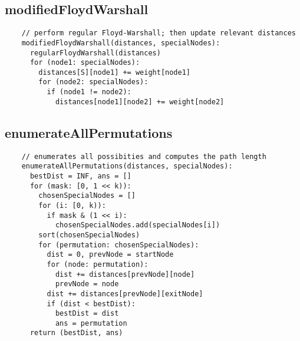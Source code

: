 \documentclass[12pt]{report}
\begin{document}
\subsection{modifiedFloydWarshall}
\begin{tcolorbox}
\begin{verbatim}
    // perform regular Floyd-Warshall; then update relevant distances
    modifiedFloydWarshall(distances, specialNodes):
      regularFloydWarshall(distances)
      for (node1: specialNodes):
        distances[S][node1] += weight[node1]
        for (node2: specialNodes):
          if (node1 != node2):
            distances[node1][node2] += weight[node2]
\end{verbatim}
\end{tcolorbox}

\subsection{enumerateAllPermutations}
\begin{tcolorbox}
\begin{verbatim}
    // enumerates all possibities and computes the path length
    enumerateAllPermutations(distances, specialNodes):
      bestDist = INF, ans = []
      for (mask: [0, 1 << k)):
        chosenSpecialNodes = []
        for (i: [0, k)):
          if mask & (1 << i):
            chosenSpecialNodes.add(specialNodes[i])
        sort(chosenSpecialNodes)
        for (permutation: chosenSpecialNodes):
          dist = 0, prevNode = startNode
          for (node: permutation):
            dist += distances[prevNode][node]
            prevNode = node
          dist += distances[prevNode][exitNode]
          if (dist < bestDist):
            bestDist = dist
            ans = permutation
      return (bestDist, ans)
\end{verbatim}
\end{tcolorbox}
\end{document}
